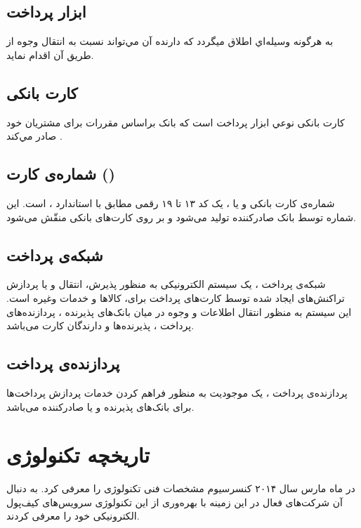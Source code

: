 \documentclass[oneside]{report}
\begin{document}
\subsection{ابزار پرداخت}
به هرگونه وسيله‌اي اطلاق ميگردد كه دارنده آن مي‌تواند نسبت به انتقال وجوه از طريق آن اقدام
نمايد. 
\subsection{کارت بانکی}
کارت بانکی
نوعي ابزار پرداخت است كه بانک براساس مقررات برای مشتريان خود صادر مي‌كند
\cite{centralbank}.

\subsection{شماره‌ی کارت   ({\normalsize {}}) }
شماره‌ی کارت بانکی و یا 
					{\normalsize {}}
			 ، 
			یک کد ۱۳ تا ۱۹ رقمی  مطابق با استاندارد {\normalsize {}}،
			است.
					این شماره توسط بانک صادر‌کننده تولید می‌شود و بر روی کارت‌های بانکی منقّش می‌شود. 

\subsection{شبکه‌ی پرداخت}
شبکه‌ی پرداخت 
			  			 				، 
			  			 				یک سیستم الکترونیکی به منظور پذیرش، انتقال و یا پردازش تراکنش‌های ایجاد شده توسط کارت‌های پرداخت برای، کالاها و خدمات وغیره است. این سیستم به منظور انتقال اطلاعات و وجوه در میان بانک‌های پذیرنده ، پردازنده‌های پرداخت ، پذیرنده‌ها و دارندگان کارت می‌باشد. 

\subsection{پردازنده‌ی پرداخت}			  			 							  			 				
پردازنده‌ی پرداخت 
			 	، 
یک موجودیت به منظور فراهم کردن خدمات پردازش پرداخت‌ها برای بانک‌های پذیرنده و یا صادر‌کننده می‌باشد. 
		
\section{ تاریخچه تکنولوژی     {\large  {}}}
					در ماه مارس سال ۲۰۱۴ کنسرسیوم 
					{\normalsize {}} 
					مشخصات فنی تکنولوژی 
					را معرفی کرد. به دنبال آن شرکت‌های فعال در این زمینه با بهره‌وری از این تکنولوژی سرویس‌های کیف‌پول الکترونیکی خود را معرفی کردند.
\end{document}
